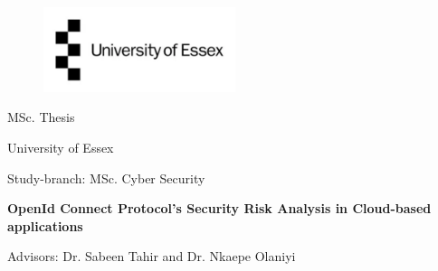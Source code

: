 
\label{titlePage}
\begin{figure}[h]
\centering
\includegraphics[width=0.50\textwidth]{pics/logo.pdf}
\end{figure}
\FloatBarrier

\begin{Large} 
\begin{center}
MSc. Thesis
\end{center}
\end{Large} 

\vspace*{5mm}

\begin{large} 
\begin{center}
University of Essex
\end{center}
\end{large} 

\begin{large} 
\begin{center}
Study-branch: MSc. Cyber Security
\end{center}
\end{large}



\begin{Large} 
\begin{center}
\textbf{OpenId Connect Protocol's Security Risk Analysis in Cloud-based applications}
\end{center}
\end{Large}

\vspace*{5mm}

\begin{large} 
\begin{center}
Advisors: Dr. Sabeen Tahir and Dr. Nkaepe Olaniyi
\end{center}
\end{large} 




\pagestyle{empty} %

